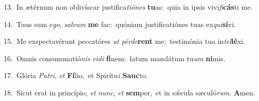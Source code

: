 {\numbfont\textcolor{\numbcolor}{13.}}~In ætérnum non oblivíscar justifica\-\textit{ti}\-\textit{ó}\textit{nes} \textbf{tu}\-as:~\star quia in ipsis vivi\-\textit{fi}\-\textbf{cás}ti me.\par
{\numbfont\textcolor{\numbcolor}{14.}}~Tuus sum e\-\textit{go}\-, \textit{sal}\-\textit{vum} \textbf{me} fac:~\star quóniam justificatiónes tuas ex\-\textit{qui}\-\textbf{sí}vi.\par
{\numbfont\textcolor{\numbcolor}{15.}}~Me exspectavérunt peccatóres \textit{ut} \textit{pér}\-\textit{de}\textbf{rent} me:~\star testimónia tua in\-\textit{tel}\-\textbf{lé}xi.\par
{\numbfont\textcolor{\numbcolor}{16.}}~Omnis consummatió\textit{nis} \textit{vi}\-\textit{di} \textbf{fi}\-nem:~\star latum mandátum tu\textit{um} \textbf{ni}\-mis.\par
{\numbfont\textcolor{\numbcolor}{17.}}~Glória \textit{Pa}\-\textit{tri}, \textit{et} \textbf{Fí}\-lio,~\star et Spirítu\textit{i} \textbf{Sanc}\-to.\par
{\numbfont\textcolor{\numbcolor}{18.}}~Sicut erat in princípio, \textit{et} \textit{nunc}\-, \textit{et} \textbf{sem}\-per,~\star et in sǽcula sæculó\-\textit{rum}\-. \textbf{A}\-men.\par
